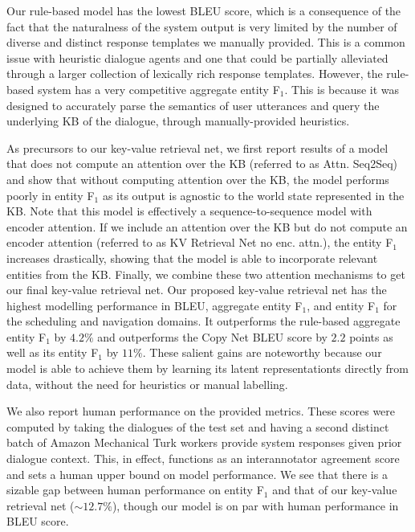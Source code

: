\documentclass[11pt,a4paper]{article}
\begin{document}
Our rule-based model has the lowest BLEU score, which is a consequence of the fact that the naturalness of the system output is very limited by the number of diverse and distinct response templates we manually provided. This is a common issue with heuristic dialogue agents and one that could be partially alleviated through a larger collection of lexically rich response templates. However, the rule-based system has a very competitive aggregate entity F$_1$. This is because it was designed to accurately parse the semantics of user utterances and query the underlying KB of the dialogue, through manually-provided heuristics. 

 As precursors to our key-value retrieval net, we first report results of a model that does not compute an attention over the KB (referred to as Attn. Seq2Seq) and show that without computing attention over the KB, the model performs poorly in entity F$_1$ as its output is agnostic to the world state represented in the KB. Note that this model is effectively a sequence-to-sequence model with encoder attention. If we include an attention over the KB but do not compute an encoder attention (referred to as KV Retrieval Net no enc. attn.), the entity F$_1$ increases drastically, showing that the model is able to incorporate relevant entities from the KB. Finally, we combine these two attention mechanisms to get our final key-value retrieval net. Our proposed key-value retrieval net has the highest modelling performance in BLEU, aggregate entity F$_1$, and entity F$_1$ for the scheduling and navigation domains. It outperforms the rule-based aggregate entity F$_1$ by $4.2\%$ and outperforms the Copy Net BLEU score by $2.2$ points as well as its entity F$_1$ by $11\%$. These salient gains are noteworthy because our model is able to achieve them by learning its latent representationts directly from data, without the need for heuristics or manual labelling.


We also report human performance on the provided metrics. These scores were computed by taking the dialogues of the test set and having a second distinct batch of Amazon Mechanical Turk workers provide system responses given prior dialogue context. This, in effect, functions as an interannotator agreement score and sets a human upper bound on model performance. We see that there is a sizable gap between human performance on entity F$_1$ and that of our key-value retrieval net ($\sim12.7\%$), though our model is on par with human performance in BLEU score. 
\end{document}
